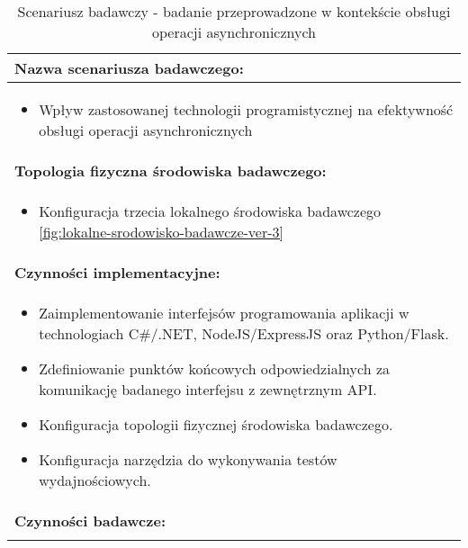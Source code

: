 \setlength{\LTcapwidth}{\textwidth}
\setlength\LTleft{0pt}
\setlength\LTright{0pt}
\begin{longtable}[c]{|llll|}
    \caption{Scenariusz badawczy - badanie przeprowadzone w kontekście obsługi operacji asynchronicznych}
    \label{tab:research-scenario-3}                                                  \\ \hline
    \multicolumn{4}{|l|}{\textbf{Nazwa scenariusza badawczego:}}                     \\ \hline
    \multicolumn{4}{|p{\linewidth}|}{
        \begin{itemize}[label={}]
            \item Wpływ zastosowanej technologii programistycznej na efektywność obsługi operacji asynchronicznych
          \end{itemize}
    } \\ \hline
    \multicolumn{4}{|l|}{\textbf{Topologia fizyczna środowiska badawczego:}}         \\ \hline
    \multicolumn{4}{|p{\linewidth}|}{
        \begin{itemize}[label={}]
            \item Konfiguracja trzecia lokalnego środowiska badawczego \ref{fig:lokalne-srodowisko-badawcze-ver-3}
          \end{itemize}
    }\\ \hline
    \multicolumn{4}{|l|}{\textbf{Czynności implementacyjne:}}                        \\ \hline
    \multicolumn{4}{|p{\linewidth}|}{
        \begin{itemize}
            \item Zaimplementowanie interfejsów programowania aplikacji w technologiach C\#/.NET, NodeJS/ExpressJS oraz Python/Flask.
            \item Zdefiniowanie punktów końcowych odpowiedzialnych za komunikację badanego interfejsu z zewnętrznym API.
            \item Konfiguracja topologii fizycznej środowiska badawczego.
            \item Konfiguracja narzędzia do wykonywania testów wydajnościowych.
        \end{itemize}}                                                           \\ \hline
    \multicolumn{4}{|l|}{\textbf{Czynności badawcze:}}                               \\ \hline
    \multicolumn{4}{|p{\linewidth}|}{
        \begin{itemize}

\end{itemize}}
\end{longtable}
